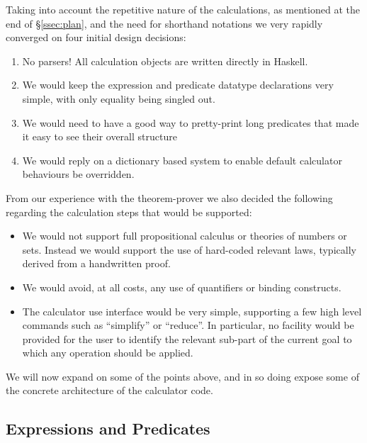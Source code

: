 Taking into account the repetitive nature of the calculations,
as mentioned at the end of \S\ref{ssec:plan},
and the need for shorthand notations we very rapidly converged
on four initial design decisions:
\begin{enumerate}
  \item No parsers! All calculation objects are written
  directly in Haskell.
  \item We would keep the expression and predicate datatype declarations
   very simple, with only equality being singled out.
  \item We would need to have a good way to pretty-print long predicates
    that made it easy to see their overall structure
  \item We would reply on a dictionary based system to enable default
    calculator behaviours be overridden.
\end{enumerate}
From our experience with the  theorem-prover we also decided
the following regarding the calculation steps that would be supported:
\begin{itemize}
  \item
    We would not support full  propositional calculus
    or theories of numbers or sets.
    Instead we would support the use of hard-coded relevant laws,
    typically derived from  a handwritten proof.
  \item
    We would avoid, at all costs,
    any use of quantifiers or binding constructs.
  \item
    The calculator use interface would be very simple,
    supporting a few high level commands such as ``simplify''
    or ``reduce''.
    In particular,
    no facility would be provided for the user to identify
    the relevant sub-part of the current goal to which any operation
    should be applied.
\end{itemize}

We will now expand on some of the points above,
and in so doing expose some of the concrete architecture of the calculator code.

\subsection{Expressions and Predicates}\label{ssec:expr-pred}

